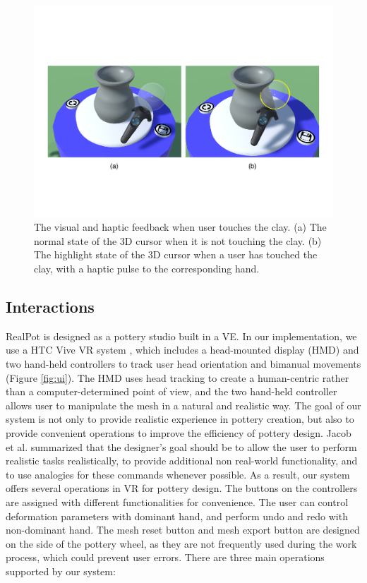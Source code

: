 \documentclass{svjour3}                     %
\begin{document}
\begin{figure}
\includegraphics[width=\textwidth]{fig10}
\caption{The visual and haptic feedback when user touches the clay. (a) The normal state of the 3D cursor when it is not touching the clay. (b) The highlight state of the 3D cursor when a user has touched the clay, with a haptic pulse to the corresponding hand.}
\label{fig:highlight}
\end{figure}

\subsection{Interactions}
\label{sec:interactions}

RealPot is designed as a pottery studio built in a VE.
In our implementation, we use a HTC Vive VR system \cite{website:vive}, which includes a head-mounted display (HMD) and two hand-held controllers to track user head orientation and bimanual movements (Figure \ref{fig:ui}).
The HMD uses head tracking to create a human-centric rather than a computer-determined point of view, and the two hand-held controller allows user to manipulate the mesh in a natural and realistic way.
The goal of our system is not only to provide realistic experience in pottery creation, but also to provide convenient operations to improve the efficiency of pottery design. 
Jacob et al. \cite{Jacob2008Reality} summarized that the designer's goal should be to allow the user to perform realistic tasks realistically, to provide additional non real-world functionality, and to use analogies for these commands whenever possible.
As a result, our system offers several operations in VR for pottery design.
The buttons on the controllers are assigned with different functionalities for convenience. The user can control deformation parameters with dominant hand, and perform undo and redo with non-dominant hand.
The mesh reset button and mesh export button are designed on the side of the pottery wheel, as they are not frequently used during the work process, which could prevent user errors.
There are three main operations supported by our system:
\end{document}
